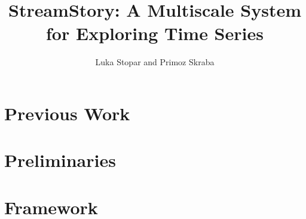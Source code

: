 \documentclass[journal]{vgtc}                %
\title{StreamStory: A Multiscale System for Exploring Time Series}
\author{Luka Stopar and Primoz Skraba}
\theoremstyle{definition}
\begin{document}

\maketitle

\label{sec:introduction}





\section{Previous Work}
\label{sec:previous}


\section{Preliminaries}


\section{Framework}
\label{sec:multiscale-framework}

\end{document}
